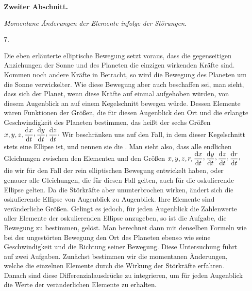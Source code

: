\par{}\bigskip
{}
\begin{center}
{\large\bfseries Zweiter Abschnitt.\par}
\medskip
\textit{Momentane Änderungen der Elemente infolge der Störungen.}
\end{center}
\begin{center}7.\end{center}
\noindent\hspace*{\parindent}Die eben erläuterte elliptische Bewegung setzt voraus, dass die gegenseitigen Anziehungen der Sonne und des Planeten die einzigen wirkenden Kräfte sind. Kommen noch andere Kräfte in Betracht, so wird die Bewegung des Planeten um die Sonne verwickelter. Wie diese Bewegung aber auch beschaffen sei, man sieht, dass sich der Planet, wenn diese Kräfte auf einmal aufgehoben würden, von diesem Augenblick an auf einem Kegelschnitt bewegen würde. Dessen Elemente wären Funktionen der Größen, die für diesen Augenblick den Ort und die erlangte Geschwindigkeit des Planeten bestimmen, das heißt der sechs Größen \(x,y,z,\dfrac{\mathrm{d}x}{\mathrm{d}t}\mathpunct{\raisebox{.45ex}{,}}\dfrac{\mathrm{d}y}{\mathrm{d}t}\mathpunct{\raisebox{.45ex}{,}}\dfrac{\mathrm{d}z}{\mathrm{d}t}\mathpunct{\cdot}\) Wir beschränken uns auf den Fall, in dem dieser Kegelschnitt stets eine Ellipse ist, und nennen sie die . Man sieht also, dass alle endlichen Gleichungen zwischen den Elementen und den Größen \(x,y,z,r,\dfrac{\mathrm{d}x}{\mathrm{d}t}\mathpunct{\raisebox{.45ex}{,}}\dfrac{\mathrm{d}y}{\mathrm{d}t}\mathpunct{\raisebox{.45ex}{,}}\dfrac{\mathrm{d}z}{\mathrm{d}t}\mathpunct{\raisebox{.45ex}{,}}\dfrac{\mathrm{d}r}{\mathrm{d}t}\mathpunct{\raisebox{.45ex}{,}}\) die wir für den Fall der rein elliptischen Bewegung entwickelt haben, oder genauer alle Gleichungen, die für diesen Fall gelten, auch für die oskulierende Ellipse gelten. Da die Störkräfte aber ununterbrochen wirken, ändert sich die oskulierende Ellipse von Augenblick zu Augenblick. Ihre Elemente sind veränderliche Größen. Gelingt es jedoch, für jeden Augenblick die Zahlenwerte aller Elemente der oskulierenden Ellipse anzugeben, so ist die Aufgabe, die Bewegung zu bestimmen, gelöst. Man berechnet dann mit denselben Formeln wie bei der ungestörten Bewegung den Ort des Planeten ebenso wie seine Geschwindigkeit und die Richtung seiner Bewegung. Diese Untersuchung führt auf zwei Aufgaben. Zunächst bestimmen wir die momentanen Änderungen, welche die einzelnen Elemente durch die Wirkung der Störkräfte erfahren. Danach sind diese Differenzialausdrücke zu integrieren, um für jeden Augenblick die Werte der veränderlichen Elemente zu erhalten.
